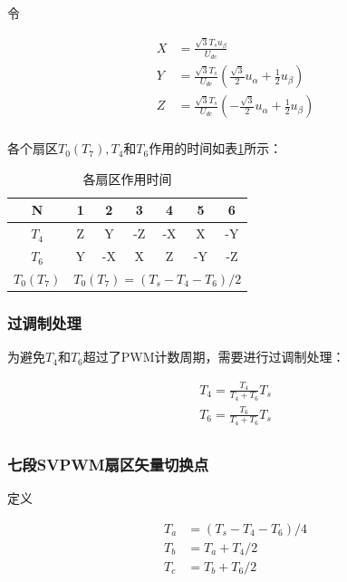 \documentclass[main.tex]{subfiles}
\begin{document}
令

\begin{equation}
\begin{aligned}
	X &= \frac{\sqrt{3}T_s u_\beta}{U_{dc}}	\\
	Y &= \frac{\sqrt{3}T_s}{U_{dc}}(\frac{\sqrt{3}}{2}u_\alpha + \frac{1}{2}u_\beta)	\\
	Z &= \frac{\sqrt{3}T_s}{U_{dc}}(-\frac{\sqrt{3}}{2}u_\alpha + \frac{1}{2}u_\beta) \\
\end{aligned}
\end{equation}

各个扇区$T_0(T_7), T_4$和$T_6$作用的时间如表\ref{各扇区作用时间}所示：
\begin{table}[H]
	\centering
	\begin{tabular}{|c|c|c|c|c|c|c|}
	\bottomrule
	N & 1 & 2 & 3 & 4 & 5 & 6	\\
	\hline
	$T_4$ & Z & Y & -Z & -X & X & -Y \\
	\hline
	$T_6$ & Y & -X & X & Z & -Y & -Z \\
	\hline
	$T_0(T_7)$ & \multicolumn{6}{c|}{$T_0(T_7) = (T_s-T_4-T_6)/2$}\\
	\toprule
	\end{tabular}
	\caption{各扇区作用时间}
	\label{各扇区作用时间}
\end{table}

\subsubsection{过调制处理}

为避免$T_4$和$T_6$超过了PWM计数周期，需要进行过调制处理：

\begin{equation}
\begin{aligned}
	T_4 = \frac{T_4}{T_4+T_6}T_s \\
	T_6 = \frac{T_6}{T_4+T_6}T_s \\
\end{aligned}
\end{equation}

\subsubsection{七段SVPWM扇区矢量切换点}

定义

\begin{equation}
\begin{aligned}
	T_a &= (T_s-T_4-T_6)/4 \\
	T_b &= T_a+T_4/2		\\
	T_c &= T_b+T_6/2		\\
\end{aligned}
\end{equation}
\end{document}
